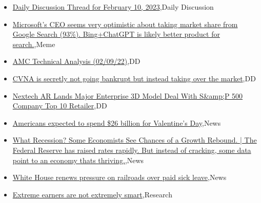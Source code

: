 \documentclass{article}%
\begin{document}
%
\begin{itemize}%
\item%
\href{https://reddit.com/r/wallstreetbets/comments/10yp500/daily\_discussion\_thread\_for\_february\_10\_2023/}{Daily Discussion Thread for February 10, 2023},Daily Discussion%
\item%
\href{https://reddit.com/r/wallstreetbets/comments/10ylwsx/microsofts\_ceo\_seems\_very\_optimistic\_about\_taking/}{Microsoft's CEO seems very optimistic about taking market share from Google Search (93\%). Bing+ChatGPT is likely better product for search.},Meme%
\item%
\href{https://reddit.com/r/wallstreetbets/comments/10yjcnq/amc\_technical\_analysis\_020922/}{AMC Technical Analysis (02/09/22)},DD%
\item%
\href{https://reddit.com/r/wallstreetbets/comments/10yj5gy/cvna\_is\_secretly\_not\_going\_bankrupt\_but\_instead/}{CVNA is secretly not going bankrupt but instead taking over the market},DD%
\item%
\href{https://reddit.com/r/Baystreetbets/comments/10yp0hg/nextech\_ar\_lands\_major\_enterprise\_3d\_model\_deal/}{Nextech AR Lands Major Enterprise 3D Model Deal With S\&amp;P 500 Company Top 10 Retailer},DD%
\item%
\href{https://reddit.com/r/Economics/comments/10ygryv/americans\_expected\_to\_spend\_26\_billion\_for/}{Americans expected to spend \$26 billion for Valentine's Day},News%
\item%
\href{https://reddit.com/r/Economics/comments/10yduul/what\_recession\_some\_economists\_see\_chances\_of\_a/}{What Recession? Some Economists See Chances of a Growth Rebound. | The Federal Reserve has raised rates rapidly. But instead of cracking, some data point to an economy thats thriving.},News%
\item%
\href{https://reddit.com/r/Economics/comments/10ya9n8/white\_house\_renews\_pressure\_on\_railroads\_over/}{White House renews pressure on railroads over paid sick leave},News%
\item%
\href{https://reddit.com/r/Economics/comments/10y6hn7/extreme\_earners\_are\_not\_extremely\_smart/}{Extreme earners are not extremely smart},Research%
\end{itemize}%
\end{document}
